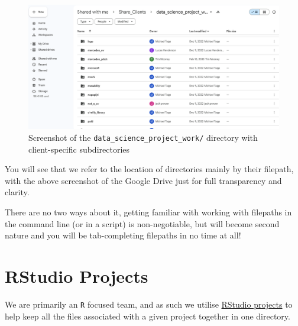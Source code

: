 \documentclass[
  letterpaper,
  DIV=11,
  numbers=noendperiod]{scrreprt}
\begin{document}
\begin{figure}[H]

{\centering \includegraphics{./img/drive_screenshot.png}

}

\caption{Screenshot of the \texttt{data\_science\_project\_work/}
directory with client-specific subdirectories}

\end{figure}%

\begin{tcolorbox}[enhanced jigsaw, colback=white, opacitybacktitle=0.6, coltitle=black, left=2mm, breakable, bottomtitle=1mm, toptitle=1mm, toprule=.15mm, colframe=quarto-callout-caution-color-frame, titlerule=0mm, title=\textcolor{quarto-callout-caution-color}{\faFire}\hspace{0.5em}{File paths}, colbacktitle=quarto-callout-caution-color!10!white, rightrule=.15mm, bottomrule=.15mm, arc=.35mm, opacityback=0, leftrule=.75mm]

You will see that we refer to the location of directories mainly by
their filepath, with the above screenshot of the Google Drive just for
full transparency and clarity.

There are no two ways about it, getting familiar with working with
filepaths in the command line (or in a script) is non-negotiable, but
will become second nature and you will be tab-completing filepaths in no
time at all!

\end{tcolorbox}

\section{RStudio Projects}\label{rstudio-projects}

We are primarily an \texttt{R} focused team, and as such we utilise
\href{https://support.posit.co/hc/en-us/articles/200526207-Using-RStudio-Projects}{RStudio
projects} to help keep all the files associated with a given project
together in one directory.
\end{document}
